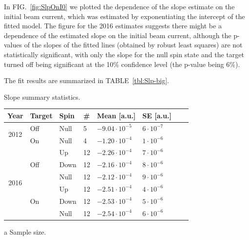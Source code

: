 \documentclass[reprint, superscriptaddress]{revtex4-1}
\newcommand{\vp}[2]{#1\cdot10^{#2}}
\begin{document}
In FIG.~\ref{fig:SlpOnI0} we plotted the dependence of the slope estimate on the initial beam current, which was estimated by exponentiating the intercept of the fitted model. 
The figure for the 2016 estimates suggests there might be a dependence of the estimated slope on the initial beam current, although the p-values of the slopes of the fitted lines (obtained by robust least squares) are not statistically significant, with only the slope for the null spin state and the target turned off being significant at the 10\% confidence level (the p-value being 6\%). %

The fit results are summarized in TABLE~\ref{tbl:Slp-big}.

\begin{threeparttable}[h]
	\centering
	\caption{Slope summary statistics. \label{tbl:Slp-big}}
	\begin{tabular}{c|lllllrr}
		\hline\hline
		        Year          & Target               & Spin & \#\tnote{a} & Mean [a.u.]      & SE [a.u.]    &  \\ \hline
		\multirow{2}{*}{2012} & Off                  & Null & 5           & $\vp{-9.04}{-5}$ & $\vp{6}{-7}$ &  \\
		                      & On                   & Null & 4           & $\vp{-1.20}{-4}$ & $\vp{1}{-6}$ &  \\ \hline
		\multirow{6}{*}{2016} & \multirow{3}{*}{Off} & Up   & 12          & $\vp{-2.26}{-4}$ & $\vp{7}{-6}$ &  \\
		                      &                      & Down & 12          & $\vp{-2.16}{-4}$ & $\vp{8}{-6}$ &  \\
		                      &                      & Null & 12          & $\vp{-2.12}{-4}$ & $\vp{9}{-6}$ &  \\
		                      & \multirow{3}{*}{On}  & Up   & 12          & $\vp{-2.51}{-4}$ & $\vp{4}{-6}$ &  \\
		                      &                      & Down & 12          & $\vp{-2.53}{-4}$ & $\vp{5}{-6}$ &  \\
		                      &                      & Null & 12          & $\vp{-2.54}{-4}$ & $\vp{6}{-6}$ &  \\ \hline\hline
	\end{tabular}
	\begin{tablenotes}
		\item[a]{Sample size.}
	\end{tablenotes}
\end{threeparttable}
\end{document}
